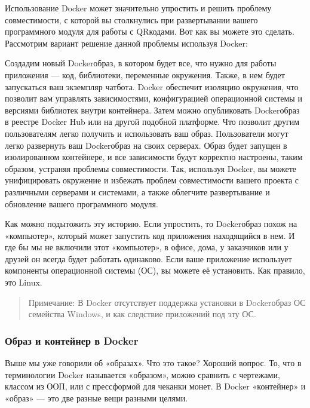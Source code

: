 \documentclass[letterpaper,10pt,russian]{sphinxmanual}
\begin{document}
\sphinxAtStartPar
Использование Docker может значительно упростить и решить проблему совместимости, с которой вы столкнулись при развертывании вашего программного модуля для работы с QR\sphinxhyphen{}кодами. Вот как вы можете это сделать. Рассмотрим вариант решение данной проблемы используя Docker:

\sphinxAtStartPar
Создадим новый Docker\sphinxhyphen{}образ, в котором будет все, что нужно для работы приложения — код, библиотеки, переменные окружения. Также, в нем будет запускаться ваш экземпляр чат\sphinxhyphen{}бота. Docker обеспечит изоляцию окружения, что позволит вам управлять зависимостями, конфигурацией операционной системы и версиями библиотек внутри контейнера. Затем можно опубликовать Docker\sphinxhyphen{}образ в реестре Docker Hub или на другой подобной платформе. Что позволит другим пользователям легко получить и использовать ваш образ. Пользователи могут легко развернуть ваш Docker\sphinxhyphen{}образ на своих серверах. Образ будет запущен в изолированном контейнере, и все зависимости будут корректно настроены, таким образом, устраняя проблемы совместимости. Так, используя Docker, вы можете унифицировать окружение и избежать проблем совместимости вашего проекта с различными серверами и системами, а также облегчите развертывание и обновление вашего программного модуля.

\sphinxAtStartPar
Как можно подытожить эту историю. Если упростить, то Docker\sphinxhyphen{}образ похож на «компьютер», который может запустить код приложения находящийся в нем. И где бы мы не включили этот «компьютер», в офисе, дома, у заказчиков или у друзей \sphinxhyphen{} он всегда будет работать одинаково. Если ваше приложение использует компоненты операционной системы (ОС), вы можете её установить. Как правило, это Linux.
\begin{quote}

\sphinxAtStartPar
Примечание: В Docker отсутствует поддержка установки в Docker\sphinxhyphen{}образ ОС семейства Windows, и как следствие приложений под эту ОС.
\end{quote}


\subsubsection{Образ и контейнер в Docker}
\label{\detokenize{educational_materials/docker_base/content:id3}}
\sphinxAtStartPar
Выше мы уже говорили об «образах». Что это такое? Хороший вопрос. То, что в терминологии Docker называется «образом», можно сравнить с чертежами, классом из ООП, или с пресс\sphinxhyphen{}формой для чеканки монет. В Docker «контейнер» и «образ» — это две разные вещи  разными целями.
\end{document}
